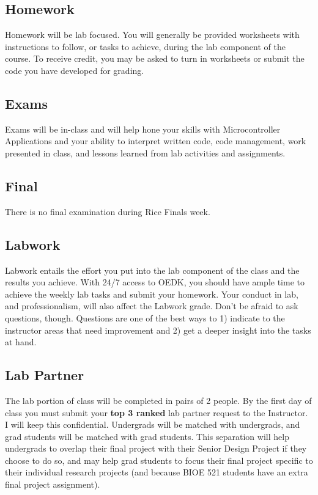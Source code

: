 \documentclass[10pt]{article}
\begin{document}
\subsection*{Homework}
Homework will be lab focused. You will generally be provided worksheets with instructions to follow, or tasks to achieve, during the lab component of the course. To receive credit, you may be asked to turn in worksheets or submit the code you have developed for grading.

\subsection*{Exams}
Exams will be in-class and will help hone your skills with Microcontroller Applications and your ability to interpret written code, code management, work presented in class, and lessons learned from lab activities and assignments.

\subsection*{Final}
There is no final examination during Rice Finals week.


\subsection*{Labwork}
Labwork entails the effort you put into the lab component of the class and the results you achieve. With 24/7 access to OEDK, you should have ample time to achieve the weekly lab tasks and submit your homework. Your conduct in lab, and professionalism, will also affect the Labwork grade. Don't be afraid to ask questions, though. Questions are one of the best ways to 1) indicate to the instructor areas that need improvement and 2) get a deeper insight into the tasks at hand.

\subsection*{Lab Partner}
The lab portion of class will be completed in pairs of 2 people. By the first day of class you must submit your \textbf{top 3 ranked} lab partner request to the Instructor. I will keep this confidential. Undergrads will be matched with undergrads, and grad students will be matched with grad students. This separation will help undergrads to overlap their final project with their Senior Design Project if they choose to do so, and may help grad students to focus their final project specific to their individual research projects (and because BIOE 521 students have an extra final project assignment).
\end{document}
